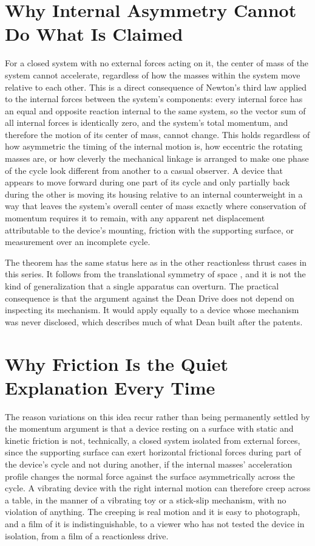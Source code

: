 \documentclass[11pt]{article}
\begin{document}
\section{Why Internal Asymmetry Cannot Do What Is Claimed}

For a closed system with no external forces acting on it, the center of mass of the system cannot accelerate, regardless of how the masses within the system move relative to each other. This is a direct consequence of Newton's third law applied to the internal forces between the system's components: every internal force has an equal and opposite reaction internal to the same system, so the vector sum of all internal forces is identically zero, and the system's total momentum, and therefore the motion of its center of mass, cannot change. This holds regardless of how asymmetric the timing of the internal motion is, how eccentric the rotating masses are, or how cleverly the mechanical linkage is arranged to make one phase of the cycle look different from another to a casual observer. A device that appears to move forward during one part of its cycle and only partially back during the other is moving its housing relative to an internal counterweight in a way that leaves the system's overall center of mass exactly where conservation of momentum requires it to remain, with any apparent net displacement attributable to the device's mounting, friction with the supporting surface, or measurement over an incomplete cycle.

The theorem has the same status here as in the other reactionless thrust cases in this series. It follows from the translational symmetry of space \cite{N1918}, and it is not the kind of generalization that a single apparatus can overturn. The practical consequence is that the argument against the Dean Drive does not depend on inspecting its mechanism. It would apply equally to a device whose mechanism was never disclosed, which describes much of what Dean built after the patents.

\section{Why Friction Is the Quiet Explanation Every Time}

The reason variations on this idea recur rather than being permanently settled by the momentum argument is that a device resting on a surface with static and kinetic friction is not, technically, a closed system isolated from external forces, since the supporting surface can exert horizontal frictional forces during part of the device's cycle and not during another, if the internal masses' acceleration profile changes the normal force against the surface asymmetrically across the cycle. A vibrating device with the right internal motion can therefore creep across a table, in the manner of a vibrating toy or a stick-slip mechanism, with no violation of anything. The creeping is real motion and it is easy to photograph, and a film of it is indistinguishable, to a viewer who has not tested the device in isolation, from a film of a reactionless drive.
\end{document}
